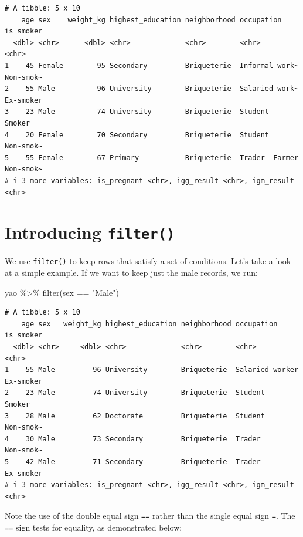\documentclass[
  letterpaper,
  DIV=11,
  numbers=noendperiod]{scrreprt}
\newenvironment{Shaded}{\begin{snugshade}}{\end{snugshade}}
\newcommand{\FunctionTok}[1]{\textcolor[rgb]{0.28,0.35,0.67}{#1}}
\newcommand{\NormalTok}[1]{\textcolor[rgb]{0.00,0.23,0.31}{#1}}
\newcommand{\SpecialCharTok}[1]{\textcolor[rgb]{0.37,0.37,0.37}{#1}}
\newcommand{\StringTok}[1]{\textcolor[rgb]{0.13,0.47,0.30}{#1}}
\begin{document}
\begin{verbatim}
# A tibble: 5 x 10
    age sex    weight_kg highest_education neighborhood occupation     is_smoker
  <dbl> <chr>      <dbl> <chr>             <chr>        <chr>          <chr>    
1    45 Female        95 Secondary         Briqueterie  Informal work~ Non-smok~
2    55 Male          96 University        Briqueterie  Salaried work~ Ex-smoker
3    23 Male          74 University        Briqueterie  Student        Smoker   
4    20 Female        70 Secondary         Briqueterie  Student        Non-smok~
5    55 Female        67 Primary           Briqueterie  Trader--Farmer Non-smok~
# i 3 more variables: is_pregnant <chr>, igg_result <chr>, igm_result <chr>
\end{verbatim}

\hypertarget{introducing-filter}{%
\section{\texorpdfstring{Introducing
\texttt{filter()}}{Introducing filter()}}\label{introducing-filter}}

We use \texttt{filter()} to keep rows that satisfy a set of conditions.
Let's take a look at a simple example. If we want to keep just the male
records, we run:

\begin{Shaded}
\begin{Highlighting}[]
\NormalTok{yao }\SpecialCharTok{\%\textgreater{}\%} \FunctionTok{filter}\NormalTok{(sex }\SpecialCharTok{==} \StringTok{"Male"}\NormalTok{)}
\end{Highlighting}
\end{Shaded}

\begin{verbatim}
# A tibble: 5 x 10
    age sex   weight_kg highest_education neighborhood occupation      is_smoker
  <dbl> <chr>     <dbl> <chr>             <chr>        <chr>           <chr>    
1    55 Male         96 University        Briqueterie  Salaried worker Ex-smoker
2    23 Male         74 University        Briqueterie  Student         Smoker   
3    28 Male         62 Doctorate         Briqueterie  Student         Non-smok~
4    30 Male         73 Secondary         Briqueterie  Trader          Non-smok~
5    42 Male         71 Secondary         Briqueterie  Trader          Ex-smoker
# i 3 more variables: is_pregnant <chr>, igg_result <chr>, igm_result <chr>
\end{verbatim}

Note the use of the double equal sign \texttt{==} rather than the single
equal sign \texttt{=}. The \texttt{==} sign tests for equality, as
demonstrated below:
\end{document}
